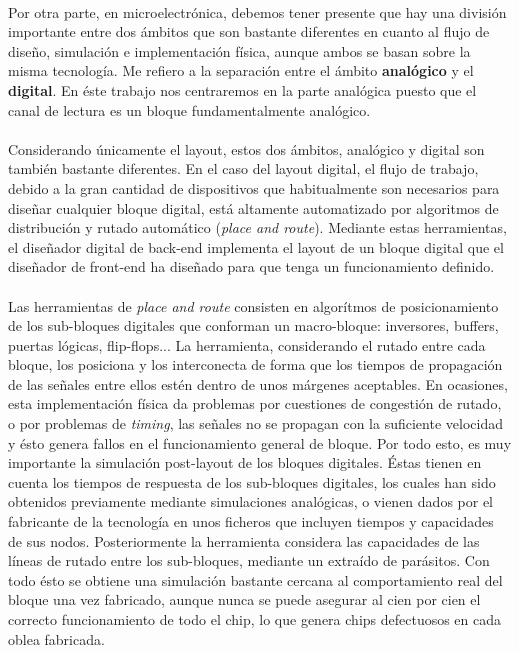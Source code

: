\paragraph{}
Por otra parte, en microelectrónica, debemos tener presente que
hay una división importante entre dos ámbitos que son bastante diferentes en cuanto
al flujo de diseño, simulación e implementación física, aunque ambos se basan sobre
la misma tecnología. Me refiero a la separación entre el ámbito \textbf{analógico}
y el \textbf{digital}. En éste trabajo nos centraremos en la parte analógica
puesto que el canal de lectura es un bloque fundamentalmente analógico.

\paragraph{}
Considerando únicamente el layout, estos dos ámbitos, analógico y
digital son también bastante diferentes. En el caso del layout digital, el flujo
de trabajo, debido a la gran cantidad de dispositivos que habitualmente son necesarios
para diseñar cualquier bloque digital, está altamente automatizado por algoritmos
de distribución y rutado automático (\textit{place and route}). Mediante estas
herramientas, el diseñador digital de back-end implementa el layout de un bloque
digital que el diseñador de front-end ha diseñado para que tenga un funcionamiento
definido.

\paragraph{}
Las herramientas de \textit{place and route} consisten en algorítmos
de posicionamiento de los sub-bloques digitales que conforman un macro-bloque:
inversores, buffers, puertas lógicas, flip-flops... La herramienta, considerando el
rutado entre cada bloque, los posiciona y los interconecta de forma que los tiempos
de propagación de las señales entre ellos estén dentro de unos márgenes aceptables.
En ocasiones, esta implementación física da problemas por cuestiones de congestión
de rutado, o por problemas de \textit{timing}, las señales no se propagan con la
suficiente velocidad y ésto genera fallos en el funcionamiento general de bloque.
Por todo esto, es muy importante la simulación post-layout de los bloques digitales.
Éstas tienen en cuenta los tiempos de respuesta de los sub-bloques digitales, los cuales
han sido obtenidos previamente mediante simulaciones analógicas, o vienen dados por
el fabricante de la tecnología en unos ficheros que incluyen tiempos y capacidades de
sus nodos. Posteriormente la herramienta considera las capacidades de las líneas de
rutado entre los sub-bloques, mediante un extraído de parásitos. Con todo ésto
se obtiene una simulación bastante cercana al comportamiento real del bloque una vez
fabricado, aunque nunca se puede asegurar al cien por cien el correcto funcionamiento
de todo el chip, lo que genera chips defectuosos en cada oblea fabricada.


